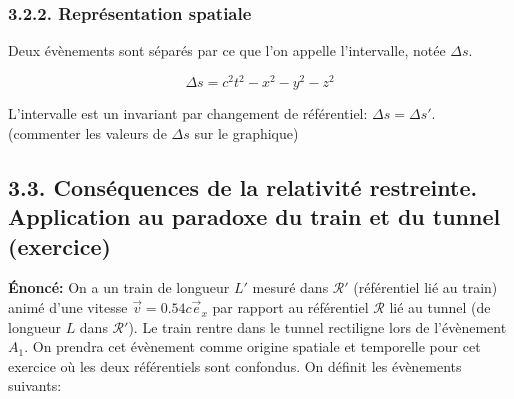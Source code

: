 \documentclass[french, a4paper, 10pt, twocolumn, landscape]{article}
\begin{document}
\subsubsection*{3.2.2. Représentation spatiale}


Deux évènements sont séparés par ce que l'on appelle l'intervalle, notée $\Delta s$. 

\begin{equation}
	\Delta s = c^2t^2-x^2-y^2-z^2
\end{equation}

L'intervalle est un invariant par changement de référentiel: $\Delta s = \Delta s'$. (commenter les valeurs de $\Delta s$ sur le graphique)

\subsection*{3.3. Conséquences de la relativité restreinte. Application au paradoxe du train et du tunnel (exercice)}

\textbf{Énoncé:} On a un train de longueur $L'$ mesuré dans $\mathcal{R}'$ (référentiel lié au train) animé d'une vitesse $\vec{v}=0.54c\vec{e}_x$ par rapport au référentiel $\mathcal{R}$ lié au tunnel (de longueur $L$ dans $\mathcal{R}'$). Le train rentre dans le tunnel rectiligne lors de l'évènement $A_1$. On prendra cet évènement comme origine spatiale et temporelle pour cet exercice où les deux référentiels sont confondus. On définit les évènements suivants:
\end{document}

